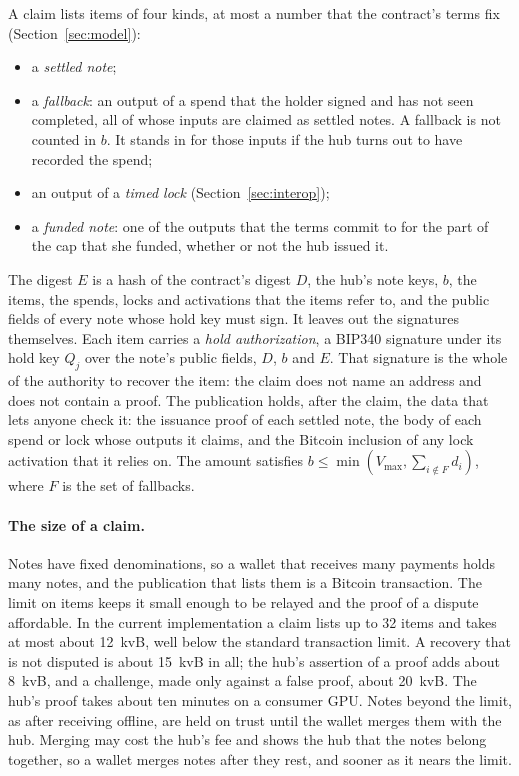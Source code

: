 \documentclass[11pt]{article}
\newcommand{\vmax}{V_{\max}}
\begin{document}
A claim lists items of four kinds, at most a number that the contract's terms fix (Section~\ref{sec:model}):
\begin{itemize}[leftmargin=1.5em, itemsep=0pt]
\item a \emph{settled note};
\item a \emph{fallback}: an output of a spend that the holder signed and has not seen completed, all of whose inputs are claimed as settled notes. A fallback is not counted in $b$. It stands in for those inputs if the hub turns out to have recorded the spend;
\item an output of a \emph{timed lock} (Section~\ref{sec:interop});
\item a \emph{funded note}: one of the outputs that the terms commit to for the part of the cap that she funded, whether or not the hub issued it.
\end{itemize}
The digest $E$ is a hash of the contract's digest $D$, the hub's note keys, $b$, the items, the spends, locks and activations that the items refer to, and the public fields of every note whose hold key must sign. It leaves out the signatures themselves. Each item carries a \emph{hold authorization}, a BIP340 signature under its hold key $Q_j$ over the note's public fields, $D$, $b$ and $E$. That signature is the whole of the authority to recover the item: the claim does not name an address and does not contain a proof. The publication holds, after the claim, the data that lets anyone check it: the issuance proof of each settled note, the body of each spend or lock whose outputs it claims, and the Bitcoin inclusion of any lock activation that it relies on. The amount satisfies $b \le \min(\vmax, \sum_{i\notin F} d_i)$, where $F$ is the set of fallbacks.

\paragraph{The size of a claim.} Notes have fixed denominations, so a wallet that receives many payments holds many notes, and the publication that lists them is a Bitcoin transaction. The limit on items keeps it small enough to be relayed and the proof of a dispute affordable. In the current implementation a claim lists up to 32 items and takes at most about 12~kvB, well below the standard transaction limit. A recovery that is not disputed is about 15~kvB in all; the hub's assertion of a proof adds about 8~kvB, and a challenge, made only against a false proof, about 20~kvB. The hub's proof takes about ten minutes on a consumer GPU. Notes beyond the limit, as after receiving offline, are held on trust until the wallet merges them with the hub. Merging may cost the hub's fee and shows the hub that the notes belong together, so a wallet merges notes after they rest, and sooner as it nears the limit.
\end{document}
